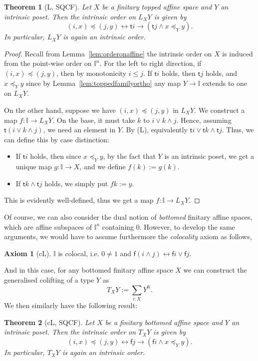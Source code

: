 \documentclass[12pt]{amsart}
\newtheorem{theorem}{Theorem}[section]
\theoremstyle{definition}
\newtheorem{axiom}{Axiom}
\newcommand{\mbb}[1]{\mathbb{#1}}
\newcommand{\I}{\mbb I}
\newcommand{\ms}[1]{\mathsf{#1}}
\newcommand{\eq}{\leftrightarrow}
\begin{document}
\begin{theorem}[L, SQCF]\label{thm:intrinsicordergenlifting}
  Let $X$ be a finitary topped affine space and $Y$ an intrinsic poset. Then the intrinsic order on $L_XY$ is given by
  \[ (i,x) \preceq (j,y) \eq \ms ti \to (\ms tj \wedge x \preceq_{Y} y). \]
  In particular, $L_XY$ is again an intrinsic order.
\end{theorem}
\begin{proof}
  Recall from Lemma~\ref{lem:orderonaffine} the intrinsic order on $X$ is induced from the point-wise order on $\I^n$. For the left to right direction, if $(i,x) \preceq (j,y)$, then by monotonicity $i \le j$. If $\ms ti$ holds, then $\ms tj$ holds, and $x \preceq_Y y$ since by Lemma~\ref{lem:toppedfamilyortho} any map $Y \to \I$ extends to one on $L_XY$.

  On the other hand, suppose we have $(i,x) \preceq (j,y)$ in $L_XY$. We construct a map $f : \I \to L_XY$. On the base, it must take $k$ to $i \vee k \wedge j$. Hence, assuming $\ms t(i \vee k \wedge j)$, we need an element in $Y$. By (L), equivalently $\ms ti \vee \ms tk \wedge \ms tj$. Thus, we can define this by case distinction:
  \begin{itemize}
    \item If $\ms ti$ holds, then since $x \preceq_Y y$, by the fact that $Y$ is an intrinsic poset, we get a unique map $g : \I \to X$, and we define $f(k) := g(k)$.
    \item If $\ms tk \wedge \ms tj$ holds, we simply put $fk := y$.
  \end{itemize}
  This is evidently well-defined, thus we get a map $f : \I \to L_XY$.
\end{proof}

Of course, we can also consider the dual notion of \emph{bottomed} finitary affine spaces, which are affine subspaces of $\I^n$ containing $0$. However, to develop the same arguments, we would have to assume furthermore the \emph{colocality} axiom as follows,

\begin{axiom}[cL]
  $\I$ is colocal, i.e. $0 \neq 1$ and $\ms f(i \wedge j) \eq \ms fi \vee \ms fj$.
\end{axiom}

And in this case, for any bottomed finitary affine space $X$ we can construct the generalised colifting of a type $Y$ as
\[ T_XY := \sum_{i:X}Y^{\ms fi}. \]
We then similarly have the following result:

\begin{theorem}[cL, SQCF]\label{thm:intrinsicordergencolifting}
  Let $X$ be a finitary bottomed affine space and $Y$ an intrinsic poset. Then the intrinsic order on $T_XY$ is given by
  \[ (i,x) \preceq (j,y) \eq \ms fj \to (\ms fi \wedge x \preceq_{Y} y). \]
  In particular, $T_XY$ is again an intrinsic order.
\end{theorem}
\end{document}
